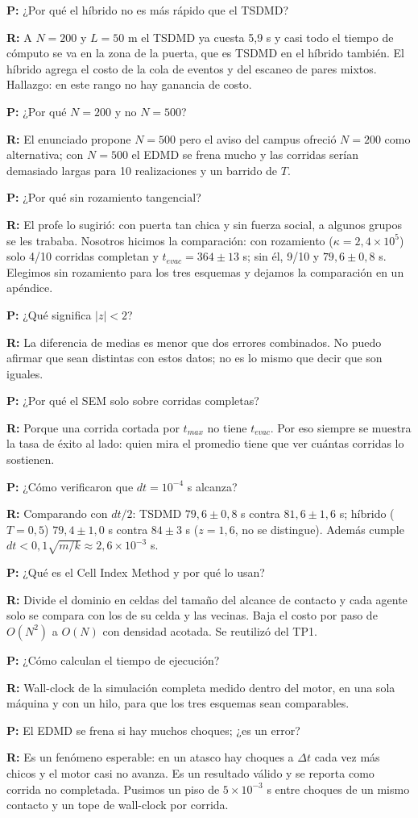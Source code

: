 \documentclass[10.5pt,a4paper]{article}
\newcommand{\tn}[2]{\ensuremath{#1\times10^{#2}}}
\newcommand{\pr}[1]{\par\textbf{P:} #1\par\nobreak}
\newcommand{\rp}[1]{\textbf{R:} #1\par}
\begin{document}
\pr{¿Por qué el híbrido no es más rápido que el TSDMD?}
\rp{A $N=200$ y $L=50$ m el TSDMD ya cuesta 5,9 s y casi todo el tiempo de cómputo se va en la zona de la puerta, que es TSDMD en el híbrido también. El híbrido agrega el costo de la cola de eventos y del escaneo de pares mixtos. Hallazgo: en este rango no hay ganancia de costo.}

\pr{¿Por qué $N=200$ y no $N=500$?}
\rp{El enunciado propone $N=500$ pero el aviso del campus ofreció $N=200$ como alternativa; con $N=500$ el EDMD se frena mucho y las corridas serían demasiado largas para 10 realizaciones y un barrido de $T$.}

\pr{¿Por qué sin rozamiento tangencial?}
\rp{El profe lo sugirió: con puerta tan chica y sin fuerza social, a algunos grupos se les trababa. Nosotros hicimos la comparación: con rozamiento ($\kappa=\tn{2{,}4}{5}$) solo 4/10 corridas completan y $t_{evac}=364\pm13$ s; sin él, 9/10 y $79{,}6\pm0{,}8$ s. Elegimos sin rozamiento para los tres esquemas y dejamos la comparación en un apéndice.}

\pr{¿Qué significa $|z|<2$?}
\rp{La diferencia de medias es menor que dos errores combinados. No puedo afirmar que sean distintas con estos datos; no es lo mismo que decir que son iguales.}

\pr{¿Por qué el SEM solo sobre corridas completas?}
\rp{Porque una corrida cortada por $t_{max}$ no tiene $t_{evac}$. Por eso siempre se muestra la tasa de éxito al lado: quien mira el promedio tiene que ver cuántas corridas lo sostienen.}

\pr{¿Cómo verificaron que $dt=10^{-4}$ s alcanza?}
\rp{Comparando con $dt/2$: TSDMD $79{,}6\pm0{,}8$ s contra $81{,}6\pm1{,}6$ s; híbrido ($T=0{,}5$) $79{,}4\pm1{,}0$ s contra $84\pm3$ s ($z=1{,}6$, no se distingue). Además cumple $dt<0{,}1\sqrt{m/k}\approx2{,}6\times10^{-3}$ s.}

\pr{¿Qué es el Cell Index Method y por qué lo usan?}
\rp{Divide el dominio en celdas del tamaño del alcance de contacto y cada agente solo se compara con los de su celda y las vecinas. Baja el costo por paso de $O(N^2)$ a $O(N)$ con densidad acotada. Se reutilizó del TP1.}

\pr{¿Cómo calculan el tiempo de ejecución?}
\rp{Wall-clock de la simulación completa medido dentro del motor, en una sola máquina y con un hilo, para que los tres esquemas sean comparables.}

\pr{El EDMD se frena si hay muchos choques; ¿es un error?}
\rp{Es un fenómeno esperable: en un atasco hay choques a $\Delta t$ cada vez más chicos y el motor casi no avanza. Es un resultado válido y se reporta como corrida no completada. Pusimos un piso de $5\times10^{-3}$ s entre choques de un mismo contacto y un tope de wall-clock por corrida.}
\end{document}
